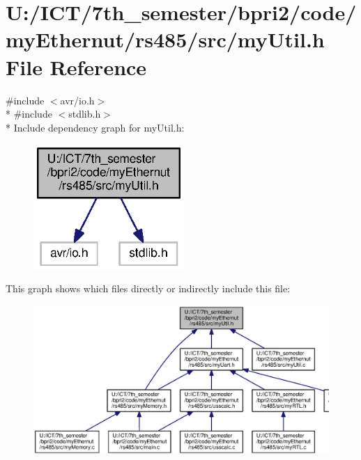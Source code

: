 \section{U\+:/\+I\+C\+T/7th\+\_\+semester/bpri2/code/my\+Ethernut/rs485/src/my\+Util.h File Reference}
\label{my_util_8h}
{\ttfamily \#include $<$avr/io.\+h$>$}\\*
{\ttfamily \#include $<$stdlib.\+h$>$}\\*
Include dependency graph for my\+Util.\+h\+:\nopagebreak
\begin{figure}[H]
\begin{center}
\leavevmode
\includegraphics[width=162pt]{my_util_8h__incl}
\end{center}
\end{figure}
This graph shows which files directly or indirectly include this file\+:\nopagebreak
\begin{figure}[H]
\begin{center}
\leavevmode
\includegraphics[width=350pt]{my_util_8h__dep__incl}
\end{center}
\end{figure}
